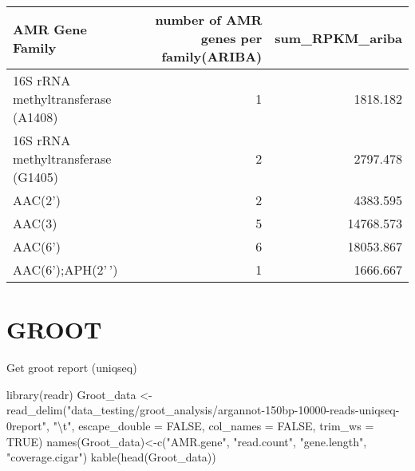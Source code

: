 \documentclass[
]{article}
\newenvironment{Shaded}{\begin{snugshade}}{\end{snugshade}}
\newcommand{\AttributeTok}[1]{\textcolor[rgb]{0.77,0.63,0.00}{#1}}
\newcommand{\ConstantTok}[1]{\textcolor[rgb]{0.00,0.00,0.00}{#1}}
\newcommand{\FunctionTok}[1]{\textcolor[rgb]{0.00,0.00,0.00}{#1}}
\newcommand{\NormalTok}[1]{#1}
\newcommand{\OtherTok}[1]{\textcolor[rgb]{0.56,0.35,0.01}{#1}}
\newcommand{\SpecialCharTok}[1]{\textcolor[rgb]{0.00,0.00,0.00}{#1}}
\newcommand{\StringTok}[1]{\textcolor[rgb]{0.31,0.60,0.02}{#1}}
\begin{document}
\begin{longtable}[]{@{}lrr@{}}
\toprule
AMR Gene Family & number of AMR genes per family(ARIBA) &
sum\_RPKM\_ariba \\
\midrule
\endhead
16S rRNA methyltransferase (A1408) & 1 & 1818.182 \\
16S rRNA methyltransferase (G1405) & 2 & 2797.478 \\
AAC(2') & 2 & 4383.595 \\
AAC(3) & 5 & 14768.573 \\
AAC(6') & 6 & 18053.867 \\
AAC(6');APH(2'\,') & 1 & 1666.667 \\
\bottomrule
\end{longtable}

\hypertarget{groot}{%
\section{GROOT}\label{groot}}

Get groot report (uniqseq)

\begin{Shaded}
\begin{Highlighting}[]
\FunctionTok{library}\NormalTok{(readr)}
\NormalTok{Groot\_data }\OtherTok{\textless{}{-}} \FunctionTok{read\_delim}\NormalTok{(}\StringTok{"data\_testing/groot\_analysis/argannot{-}150bp{-}10000{-}reads{-}uniqseq{-}0report"}\NormalTok{, }
    \StringTok{"}\SpecialCharTok{\textbackslash{}t}\StringTok{"}\NormalTok{, }\AttributeTok{escape\_double =} \ConstantTok{FALSE}\NormalTok{, }\AttributeTok{col\_names =} \ConstantTok{FALSE}\NormalTok{, }
    \AttributeTok{trim\_ws =} \ConstantTok{TRUE}\NormalTok{)}
\FunctionTok{names}\NormalTok{(Groot\_data)}\OtherTok{\textless{}{-}}\FunctionTok{c}\NormalTok{(}\StringTok{"AMR.gene"}\NormalTok{, }\StringTok{"read.count"}\NormalTok{, }\StringTok{"gene.length"}\NormalTok{, }\StringTok{"coverage.cigar"}\NormalTok{)}
\FunctionTok{kable}\NormalTok{(}\FunctionTok{head}\NormalTok{(Groot\_data))}
\end{Highlighting}
\end{Shaded}
\end{document}
